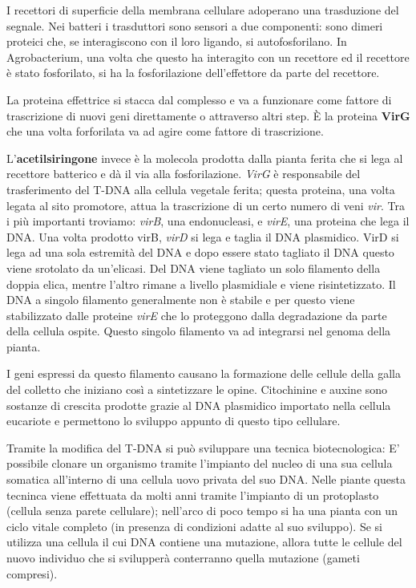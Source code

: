 \documentclass[]{article}
\begin{document}
I recettori di superficie della membrana cellulare adoperano una
trasduzione del segnale. Nei batteri i trasduttori sono sensori a due
componenti: sono dimeri proteici che, se interagiscono con il loro
ligando, si autofosforilano. In Agrobacterium, una volta che questo ha
interagito con un recettore ed il recettore è stato fosforilato, si ha
la fosforilazione dell'effettore da parte del recettore.

La proteina effettrice si stacca dal complesso e va a funzionare come
fattore di trascrizione di nuovi geni direttamente o attraverso altri
step. È la proteina \textbf{VirG} che una volta forforilata va ad agire
come fattore di trascrizione.

L'\textbf{acetilsiringone} invece è la molecola prodotta dalla pianta
ferita che si lega al recettore batterico e dà il via alla
fosforilazione. \emph{VirG} è responsabile del trasferimento del T-DNA
alla cellula vegetale ferita; questa proteina, una volta legata al sito
promotore, attua la trascrizione di un certo numero di veni \emph{vir}.
Tra i più importanti troviamo: \emph{virB}, una endonucleasi, e
\emph{virE}, una proteina che lega il DNA. Una volta prodotto virB,
\emph{virD} si lega e taglia il DNA plasmidico. VirD si lega ad una sola
estremità del DNA e dopo essere stato tagliato il DNA questo viene
srotolato da un'elicasi. Del DNA viene tagliato un solo filamento della
doppia elica, mentre l'altro rimane a livello plasmidiale e viene
risintetizzato. Il DNA a singolo filamento generalmente non è stabile e
per questo viene stabilizzato dalle proteine \emph{virE} che lo
proteggono dalla degradazione da parte della cellula ospite. Questo
singolo filamento va ad integrarsi nel genoma della pianta.

I geni espressi da questo filamento causano la formazione delle cellule
della galla del colletto che iniziano così a sintetizzare le opine.
Citochinine e auxine sono sostanze di crescita prodotte grazie al DNA
plasmidico importato nella cellula eucariote e permettono lo sviluppo
appunto di questo tipo cellulare.

Tramite la modifica del T-DNA si può sviluppare una tecnica
biotecnologica: E' possibile clonare un organismo tramite l'impianto del
nucleo di una sua cellula somatica all'interno di una cellula uovo
privata del suo DNA. Nelle piante questa tecninca viene effettuata da
molti anni tramite l'impianto di un protoplasto (cellula senza parete
cellulare); nell'arco di poco tempo si ha una pianta con un ciclo vitale
completo (in presenza di condizioni adatte al suo sviluppo). Se si
utilizza una cellula il cui DNA contiene una mutazione, allora tutte le
cellule del nuovo individuo che si svilupperà conterranno quella
mutazione (gameti compresi).
\end{document}

